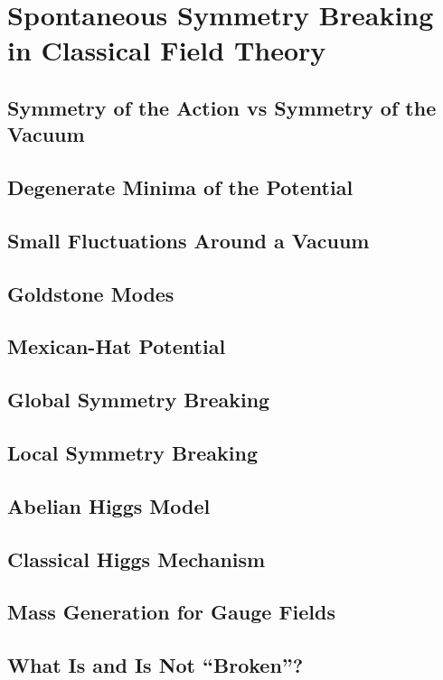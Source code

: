 \chapter{Spontaneous Symmetry Breaking in Classical Field Theory}

\section{Symmetry of the Action vs Symmetry of the Vacuum}
\section{Degenerate Minima of the Potential}
\section{Small Fluctuations Around a Vacuum}
\section{Goldstone Modes}
\section{Mexican-Hat Potential}
\section{Global Symmetry Breaking}
\section{Local Symmetry Breaking}
\section{Abelian Higgs Model}
\section{Classical Higgs Mechanism}
\section{Mass Generation for Gauge Fields}
\section{What Is and Is Not ``Broken''?}
